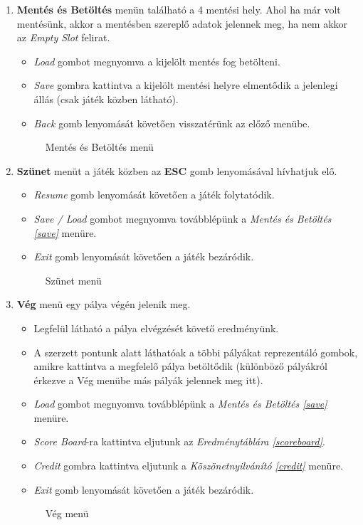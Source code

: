 \begin{enumerate}
	\item \label{save} \textbf{Mentés és Betöltés} menün található a 4 mentési hely. Ahol ha már volt mentésünk, akkor a mentésben szereplő adatok jelennek meg, ha nem akkor az \textit{Empty Slot} felirat.   
	\begin{itemize}
		\item \textit{Load} gombot megnyomva a kijelölt mentés fog betölteni.
		\item \textit{Save} gombra kattintva a kijelölt mentési helyre elmentődik a jelenlegi állás (csak játék közben látható).
		\item \textit{Back} gomb lenyomását követően visszatérünk az előző menübe.
	\end{itemize}
	\begin{figure}[H]
		\noindent{}
		\caption{Mentés és Betöltés menü}
		\label{saveLoad}
	\end{figure}
	
	\item \label{pause} \textbf{Szünet} menüt a játék közben az \textbf{ESC} gomb lenyomásával hívhatjuk elő.
	\begin{itemize}
		\item \textit{Resume} gomb lenyomását követően a játék folytatódik.
		\item \textit{Save / Load} gombot megnyomva továbblépünk a \textit{Mentés és Betöltés \ref{save}} menüre.
		\item \textit{Exit} gomb lenyomását követően a játék bezáródik.
	\end{itemize}
	\begin{figure}[H]
		\noindent{}
		\caption{Szünet menü}
		\label{pauseF}
	\end{figure}
	
	\item \label{end} \textbf{Vég} menü egy pálya végén jelenik meg.
	\begin{itemize}
		\item Legfelül látható a pálya elvégzését követő eredményünk.
		\item A szerzett pontunk alatt láthatóak a többi pályákat reprezentáló gombok, amikre kattintva a megfelelő pálya betöltődik (különböző pályákról érkezve a Vég menübe más pályák jelennek meg itt).
		\item \textit{Load} gombot megnyomva továbblépünk a \textit{Mentés és Betöltés \ref{save}} menüre.
		\item \textit{Score Board}-ra kattintva eljutunk az \textit{Eredménytáblára \ref{scoreboard}}.
		\item \textit{Credit} gombra kattintva eljutunk a \textit{Köszönetnyilvánító \ref{credit}} menüre.
		\item \textit{Exit} gomb lenyomását követően a játék bezáródik.
	\end{itemize}
	\begin{figure}[H]
		\noindent{}
		\caption{Vég menü}
		\label{endF}
	\end{figure}
	

\end{enumerate}
